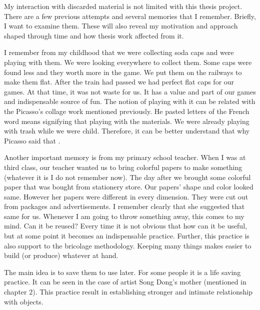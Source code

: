 My interaction with discarded material is not limited with this thesis project. There are a few previous attempts and several memories that I remember. Briefly, I want to examine them. These will also reveal my motivation and approach shaped through time and how thesis work affected from it.

I remember from my childhood that we were collecting soda caps and were playing with them. We were looking everywhere to collect them. Some caps were found less and they worth more in the game. We put them on the railways to make them flat. After the train had passed we had perfect flat caps for our games. At that time, it was not waste for us. It has a value and part of our games and indispensable source of fun. The notion of playing with it can be related with the Picasso's collage work  mentioned previously. He pasted letters of the French word  means  signifying that playing with the materials. We were already playing with trash while we were child. Therefore, it can be better understand that why Picasso said that .

Another important memory is from my primary school teacher. When I was at third class, our teacher wanted us to bring colorful papers to make something (whatever it is I do not remember now). The day after we brought some colorful paper that was bought from stationery store. Our papers' shape and color looked same. However her papers were different in every dimension. They were cut out from packages and advertisements. I remember clearly that she suggested that same for us.  Whenever I am going to throw something away, this comes to my mind. Can it be reused? Every time it is not obvious that how can it be useful, but at some point it becomes an indispensable practice. Further, this practice is also support to the bricolage methodology. Keeping many things makes easier to build (or produce) whatever at hand. 

The main idea is to save them to use later. For some people it is a life saving practice. It can be seen in the case of artist Song Dong's mother (mentioned in chapter 2). This practice result in establishing stronger and intimate relationship with objects. 

